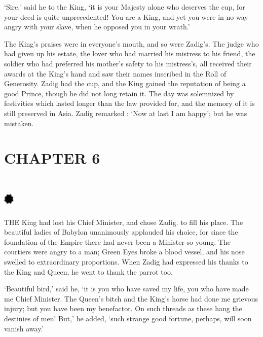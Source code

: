 \documentclass{article}
\begin{document}
\begin{center}
`Sire,' said he to the King, `it is your Majesty alone who deserves the cup, for 
your deed is quite unprecedented! You are a King, and yet you were in no way angry 
with your slave, when he opposed you in your wrath.' 

The King's praises were in everyone's mouth, and so were Zadig's. The judge who 
had given up his estate, the lover who had married his mistress to his friend, 
the soldier who had preferred his mother's safety to his mistress's, all received 
their awards at the King's hand and saw their names inscribed in the Roll of Generosity. 
Zadig had the cup, and the King gained the reputation of being a good Prince, though 
he did not long retain it. The day was solemnized by festivities which lasted longer 
than the law provided for, and the memory of it is still preserved in Asia. Zadig 
remarked : `Now at last I am happy'; but he was mistaken.\pagebreak{} 

\section*{\textbf{CHAPTER 6  }}

\section*{%
\includegraphics[width=14pt, height=15pt, keepaspectratio=true]{Zadig or L'Ingenu - Voltaire-fig009.jpg}
}

 

THE King had lost his Chief Minister, and chose Zadig. to fill his place. The beautiful 
ladies of Babylon unanimously applauded his choice, for since the foundation of 
the Empire there had never been a Minister so young. The courtiers were angry to 
a man; Green Eyes broke a blood vessel, and his nose swelled to extraordinary proportions. 
When Zadig had expressed his thanks to the King and Queen, he went to thank the 
parrot too. 

`Beautiful bird,' said he, `it is you who have saved my life, you who have made 
me Chief Minister. The Queen's bitch and the King's horse had done me grievous 
injury; but you have been my benefactor. On such threads as these hang the destinies 
of men! But,' he added, `such strange good fortune, perhaps, will soon vanish away.' 


\end{center}
\end{document}
